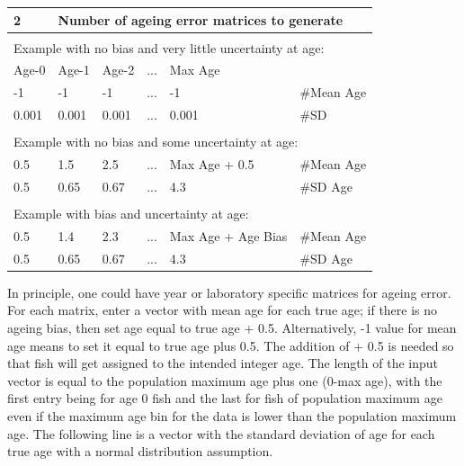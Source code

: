 \begin{center}
	\begin{longtable}{p{2cm} p{2cm} p{2cm} p{1cm} p{4.5cm} p{2.5cm}}
		\hline
		\multicolumn{1}{l}{2} & \multicolumn{5}{l}{Number of ageing error matrices to generate} \Tstrut\Bstrut\\
		\hline \\
		\multicolumn{6}{l}{Example with no bias and very little uncertainty at age:} \Tstrut\Bstrut\\
		\hline
		Age-0 & Age-1 & Age-2 &...& Max Age & \Tstrut\Bstrut\\
		\hline
		-1 & -1 & -1 &...& -1 & \#Mean Age \Tstrut\\
		0.001 & 0.001 & 0.001 &...& 0.001 & \#SD \Bstrut\\
		\hline \\
		\multicolumn{6}{l}{Example with no bias and some uncertainty at age:} \Tstrut\Bstrut\\
		\hline
		0.5 & 1.5 & 2.5 &...& Max Age + 0.5 & \#Mean Age \Tstrut\\
		0.5 & 0.65 & 0.67 &...& 4.3 & \#SD Age \Bstrut\\
		\hline \\
		\multicolumn{6}{l}{Example with bias and uncertainty at age:} \Tstrut\Bstrut\\
		\hline
		0.5 & 1.4 & 2.3 &...& Max Age + Age Bias & \#Mean Age \Tstrut\\
		0.5 & 0.65 & 0.67 &...& 4.3 & \#SD Age \Bstrut\\
		\hline
	\end{longtable}
\end{center}

In principle, one could have year or laboratory specific matrices for ageing error. For each matrix, enter a vector with mean age for each true age; if there is no ageing bias, then set age equal to true age + 0.5.  Alternatively, -1 value for mean age means to set it equal to true age plus 0.5. The addition of + 0.5 is needed so that fish will get assigned to the intended integer age. The length of the input vector is equal to the population maximum age plus one (0-max age), with the first entry being for age 0 fish and the last for fish of population maximum age even if the maximum age bin for the data is lower than the population maximum age. The following line is a vector with the standard deviation of age for each true age with a normal distribution assumption.

